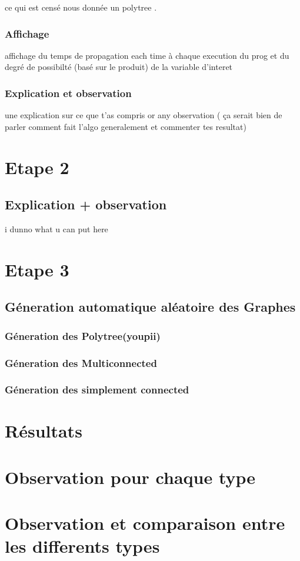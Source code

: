 \documentclass[12pt,a4paper,oneside]{book}
\begin{document}
	ce qui est censé nous donnée un polytree .
	
	
	\subsubsection{Affichage}
	affichage du temps de propagation each time à chaque execution du prog et du degré de possibilté (basé sur le produit) de la variable d'interet 
	\subsubsection{Explication et observation}
	une explication  sur ce que t'as compris or any observation ( ça serait bien de parler comment fait l'algo generalement et commenter tes resultat)
	
	\section{Etape 2}
	\subsection{Explication + observation }
       i dunno what u can put here
       
    \section{Etape 3}
    \subsection{Géneration automatique aléatoire des Graphes}
    \subsubsection{Géneration des Polytree(youpii)}
    \subsubsection{Géneration des Multiconnected}
    \subsubsection{Géneration des simplement connected}
    \section{Résultats}
    
    \section{Observation pour chaque type }
    \section{Observation et comparaison entre les differents types}
\end{document}
